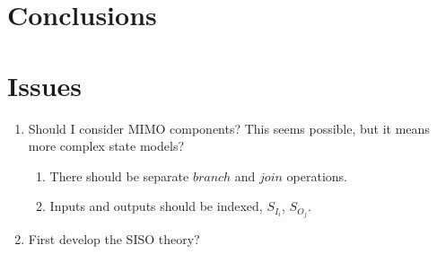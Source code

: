 \documentclass[unnumsec,webpdf,contemporary,large]{oup-authoring-template}%
\theoremstyle{thmstyleone}%
\theoremstyle{thmstyletwo}%
\theoremstyle{thmstylethree}%
\begin{document}
\section{Conclusions}

\section{Issues}
\begin{enumerate}
    \item Should I consider MIMO components? This seems possible, but it means more complex state models?
    \begin{enumerate}
    \item There should be separate $branch$ and $join$ operations.
    \item Inputs and outputs should be indexed, $S_{I_i}$, $S_{O_j}$.
    \end{enumerate}
    \item First develop the SISO theory?
\end{enumerate}



\end{document}
